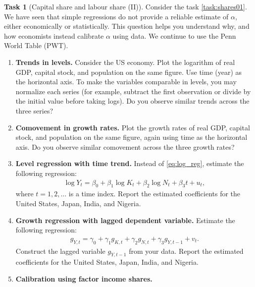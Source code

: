 \documentclass{book}
\theoremstyle{definition}
\newtheorem{task}{Task}[chapter]
\theoremstyle{plain}
\begin{document}
\begin{task}[Capital share and labour share (II)]\label{task:shares02}
    Consider the task \ref{task:shares01}. We have seen that simple regressions do not provide a reliable estimate of $\alpha$, either economically or statistically. This question helps you understand why, and how economists instead calibrate $\alpha$ using data. We continue to use the Penn World Table (PWT).
    \begin{enumerate}[label=\arabic*.]
        \item \textbf{Trends in levels.}  
        Consider the US economy. Plot the logarithm of real GDP, capital stock, and population on the same figure. Use time (year) as the horizontal axis. To make the variables comparable in levels, you may normalize each series (for example, subtract the first observation or divide by the initial value before taking logs). Do you observe similar trends across the three series?
        
        \item \textbf{Comovement in growth rates.}  
        Plot the growth rates of real GDP, capital stock, and population on the same figure, again using time as the horizontal axis. Do you observe similar comovement across the three growth rates?
        
        \item \textbf{Level regression with time trend.}  
        Instead of \eqref{eq:log_reg}, estimate the following regression:
        \begin{align}\label{eq:log_reg_trend}
        \log Y_t = \beta_0 + \beta_1 \log K_t + \beta_2 \log N_t + \beta_3 t + u_t,
        \end{align}
        where $t = 1,2,\dots$ is a time index. Report the estimated coefficients for the United States, Japan, India, and Nigeria.
        
        \item \textbf{Growth regression with lagged dependent variable.}  
        Estimate the following regression:
        \begin{align}\label{eq:growth_reg_lag}
        g_{Y,t} = \gamma_0 + \gamma_1 g_{K,t} + \gamma_2 g_{N,t} + \gamma_3 g_{Y,t-1} + v_t.
        \end{align}
        Construct the lagged variable $g_{Y,t-1}$ from your data. Report the estimated coefficients for the United States, Japan, India, and Nigeria.

        \item \textbf{Calibration using factor income shares.}
        

\end{enumerate}
\end{task}
\end{document}
